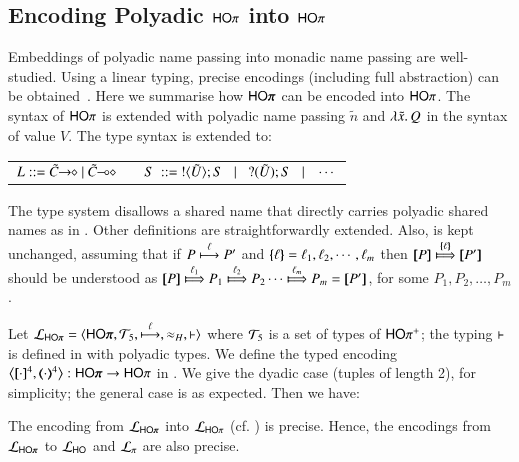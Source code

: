 \subsection{Encoding Polyadic $\mathsf{HO}\pi$ into $\mathsf{HO}\pi$}
\label{subsec:pho}
\noi Embeddings of polyadic name passing into monadic name passing are
well-studied. %
Using a linear typing, precise
encodings (including full abstraction) can be obtained~\cite{Yoshida96}.
Here we summarise how $\PHOp$ can be encoded into $\mathsf{HO}\pi$. 
The syntax of 
$\mathsf{HO}\pi$ is extended %
with
polyadic name passing $\tilde{n}$ and $\lambda \tilde{x}.\,Q$ in the syntax 
of value $V$. The type syntax is extended to: 
%
\begin{center}
\begin{tabular}{c}
$
L ::= \shot{\tilde{C}} \ | \ \lhot{\tilde{C}}
\quad\quad S \ ::= \  \btout{\tilde{U}} S \bnfbar \btinp{\tilde{U}} S \bnfbar \cdots 
$
\end{tabular}
\end{center}
%
The type system disallows a shared name that directly carries polyadic
shared names as in \cite{tlca07,MostrousY15}.
Other definitions are straightforwardly extended. 
Also,  is kept unchanged, 
assuming that if 
$P \stackrel{\ell}{\longmapsto} P'$ and $\{\!\!\{\ell\}\!\!\} = \ell_1, \ell_2,  \cdots, \ell_m$ then
$\map{P} \Hby{\mapa{\ell}} \map{P'}$
should be understood as
$\map{P} \Hby{\ell_1} P_1 \Hby{\ell_2} P_2 \cdots \Hby{\ell_m} P_m =  \map{P'}$,
for some
$P_1, P_2, \ldots, P_m$.

Let $\tyl{L}_{\PHOp}=\calc{\PHOp}{{\cal{T}}_5}{\hby{\ell}}{\wb_H}{\proves}$
where 
${\cal{T}}_5$ is a set of types of $\mathsf{HO\pi^{+}}$;  
the typing $\vdash$ is defined in 
 with polyadic types. 
We define %
the typed encoding $\enco{\map{\cdot}^{4}, \mapt{\cdot}^{4} %
}: \PHOp \to \HOp$ 
in . We give the dyadic case (tuples of length 2), for simplicity;
the general case is as expected.
Then we have:

\smallskip 

\begin{theorem}
\label{f:enc:phopiptohopi}
The encoding from $\tyl{L}_{\PHOp}$ into $\mathcal{L}_{\mathsf{HO}\pi}$ (cf. )
is precise. 
Hence, the encodings 
from $\tyl{L}_{\PHOp}$ to 
$\mathcal{L}_{\mathsf{HO}}$ 
and $\mathcal{L}_{\pi}$ 
are also precise. 
\end{theorem}

